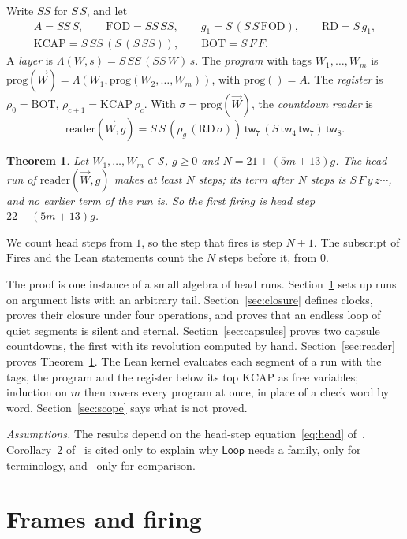 \documentclass[11pt]{amsart}
\newtheorem{theorem}{Theorem}
\theoremstyle{definition}
\newcommand{\Ter}{\mathcal S}
\newcommand{\tw}[1]{\mathsf{tw}_{#1}}
\newcommand{\Fires}{\mathrm{Fires}}
\newcommand{\BOT}{\mathrm{BOT}}
\newcommand{\KCAP}{\mathrm{KCAP}}
\newcommand{\RD}{\mathrm{RD}}
\newcommand{\FOD}{\mathrm{FOD}}
\newcommand{\prog}{\mathrm{prog}}
\newcommand{\lam}{\Lambda}
\newcommand{\rd}{\mathrm{reader}}
\newcommand{\Loop}{\mathsf{Loop}}
\begin{document}
Write $SS$ for $S\,S$, and let
\begin{gather*}
A=SS\,S,\qquad \FOD=SS\,SS,\qquad g_1=S\,(S\,S\,\FOD),\qquad \RD=S\,g_1,\\
\KCAP=S\,SS\,(S\,(S\,SS)),\qquad \BOT=S\,F\,F.
\end{gather*}
A \emph{layer} is $\lam(W,s)=S\,SS\,(SS\,W)\,s$. The \emph{program} with tags $W_1,\dots,W_m$ is
$\prog(\vec W)=\lam(W_1,\prog(W_2,\dots,W_m))$, with $\prog()=A$. The \emph{register} is
$\rho_0=\BOT$, $\rho_{c+1}=\KCAP\,\rho_c$. With $\sigma=\prog(\vec W)$, the \emph{countdown
reader} is
\[
\rd(\vec W,g)=S\,S\,(\rho_g\,(\RD\,\sigma))\,\tw7\,(S\,\tw4\,\tw7)\,\tw8 .
\]

\begin{theorem}\label{thm:main}
Let $W_1,\dots,W_m\in\Ter$, $g\ge0$ and $N=21+(5m+13)g$. The head run of $\rd(\vec W,g)$ makes at
least $N$ steps; its term after $N$ steps is $S\,F\,y\,z\cdots$, and no earlier term of the run is.
So the first firing is head step $22+(5m+13)g$.
\end{theorem}

We count head steps from $1$, so the step that fires is step $N+1$. The subscript of $\Fires$ and
the Lean statements count the $N$ steps before it, from $0$.

The proof is one instance of a small algebra of head runs. Section~\ref{sec:frames} sets up runs
on argument lists with an arbitrary tail. Section~\ref{sec:closure} defines clocks, proves their
closure under four operations, and proves that an endless loop of quiet segments is silent and
eternal. Section~\ref{sec:capsules} proves two capsule countdowns, the first with its revolution
computed by hand. Section~\ref{sec:reader} proves Theorem~\ref{thm:main}. The Lean kernel evaluates
each segment of a run with the tags, the program and the register below its top $\KCAP$ as free
variables; induction on $m$ then covers every program at once, in place of a check word by word.
Section~\ref{sec:scope} says what is not proved.

\emph{Assumptions.} The results depend on the head-step equation~\eqref{eq:head}
of~\citep{s1}. Corollary~2 of~\citep{s7} is cited only to explain why $\Loop$ needs a family,
\citep{s11} only for terminology, and~\citep{clocknote,murm2} only for comparison.

\section{Frames and firing}\label{sec:frames}
\end{document}

